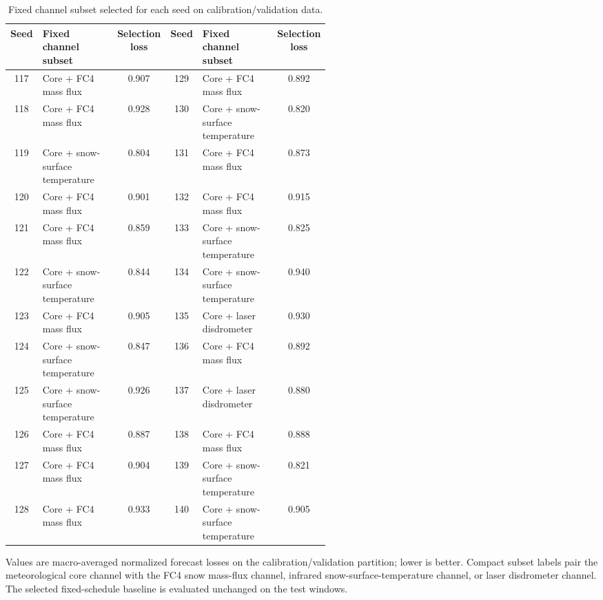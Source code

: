 \begin{table}[H]
  \centering
  \caption{Fixed channel subset selected for each seed on calibration/validation data.}
  \label{tab:static_mask_selection_ledger}
  \scriptsize
  \setlength{\tabcolsep}{2.4pt}
  \begin{tabular}{@{}c p{0.27\linewidth} c c p{0.27\linewidth} c@{}}
    \toprule
    Seed & Fixed channel subset & Selection loss & Seed & Fixed channel subset & Selection loss \\
    \midrule
    117 & Core + FC4 mass flux & 0.907 & 129 & Core + FC4 mass flux & 0.892 \\
    118 & Core + FC4 mass flux & 0.928 & 130 & Core + snow-surface temperature & 0.820 \\
    119 & Core + snow-surface temperature & 0.804 & 131 & Core + FC4 mass flux & 0.873 \\
    120 & Core + FC4 mass flux & 0.901 & 132 & Core + FC4 mass flux & 0.915 \\
    121 & Core + FC4 mass flux & 0.859 & 133 & Core + snow-surface temperature & 0.825 \\
    122 & Core + snow-surface temperature & 0.844 & 134 & Core + snow-surface temperature & 0.940 \\
    123 & Core + FC4 mass flux & 0.905 & 135 & Core + laser disdrometer & 0.930 \\
    124 & Core + snow-surface temperature & 0.847 & 136 & Core + FC4 mass flux & 0.892 \\
    125 & Core + snow-surface temperature & 0.926 & 137 & Core + laser disdrometer & 0.880 \\
    126 & Core + FC4 mass flux & 0.887 & 138 & Core + FC4 mass flux & 0.888 \\
    127 & Core + FC4 mass flux & 0.904 & 139 & Core + snow-surface temperature & 0.821 \\
    128 & Core + FC4 mass flux & 0.933 & 140 & Core + snow-surface temperature & 0.905 \\
    \bottomrule
  \end{tabular}
  \vspace{0.4ex}

  \noindent\footnotesize
  Values are macro-averaged normalized forecast losses on the
  calibration/validation partition; lower is better. Compact subset labels pair
  the meteorological core channel with the FC4 snow mass-flux channel, infrared
  snow-surface-temperature channel, or laser disdrometer channel. The selected
  fixed-schedule baseline is evaluated unchanged on the test windows.
\end{table}
